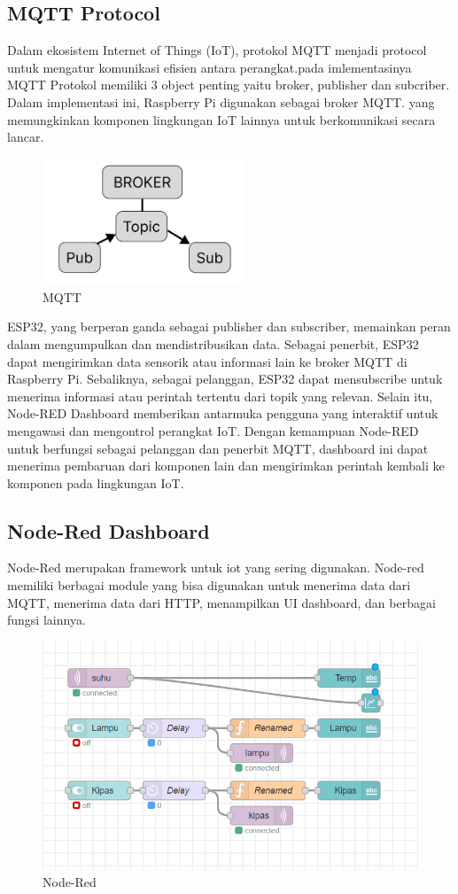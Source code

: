 \subsection{MQTT Protocol}
Dalam ekosistem Internet of Things (IoT), protokol MQTT menjadi protocol untuk mengatur komunikasi efisien antara perangkat.pada imlementasinya MQTT Protokol memiliki 3 object penting yaitu broker, publisher dan subcriber. Dalam implementasi ini, Raspberry Pi digunakan sebagai broker MQTT. yang memungkinkan komponen lingkungan IoT lainnya untuk berkomunikasi secara lancar.
\begin{figure}[H]
    \centering
    \includegraphics[width=6cm]{image/MQTT.png}
    \caption{MQTT}
    \label{fig:mqtt}
\end{figure}
ESP32, yang berperan ganda sebagai publisher dan subscriber, memainkan peran dalam mengumpulkan dan mendistribusikan data. Sebagai penerbit, ESP32 dapat mengirimkan data sensorik atau informasi lain ke broker MQTT di Raspberry Pi. Sebaliknya, sebagai pelanggan, ESP32 dapat mensubscribe untuk menerima informasi atau perintah tertentu dari topik yang relevan.
Selain itu, Node-RED Dashboard memberikan antarmuka pengguna yang interaktif untuk mengawasi dan mengontrol perangkat IoT. Dengan kemampuan Node-RED untuk berfungsi sebagai pelanggan dan penerbit MQTT, dashboard ini dapat menerima pembaruan dari komponen lain dan mengirimkan perintah kembali ke komponen pada lingkungan IoT. 

\subsection{Node-Red Dashboard}
Node-Red merupakan framework untuk iot yang sering digunakan. Node-red memiliki berbagai module yang bisa digunakan untuk menerima data dari MQTT, menerima data dari HTTP, menampilkan UI dashboard, dan berbagai fungsi lainnya. 

\begin{figure}[H]
    \centering
    \includegraphics[width=13cm]{image/Node-red.png}
    \caption{Node-Red}
    \label{fig:node-red}
\end{figure}

